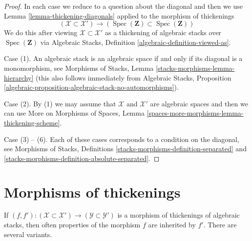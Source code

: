\documentclass{stacks-project}
\theoremstyle{plain}
\theoremstyle{definition}
\theoremstyle{remark}
\numberwithin{equation}{subsection}
\def\Spec{\mathop{\mathrm{Spec}}}
\begin{document}
\begin{proof}
In each case we reduce to a question about the diagonal and then
we use Lemma \ref{lemma-thickening-diagonals} applied to the
morphism of thickenings
$$
(\mathcal{X} \subset \mathcal{X}') \to
\left(\Spec(\mathbf{Z}) \subset \Spec(\mathbf{Z})\right)
$$
We do this after viewing
$\mathcal{X} \subset \mathcal{X}'$ as a thickening of algebraic stacks
over $\Spec(\mathbf{Z})$ via
Algebraic Stacks, Definition \ref{algebraic-definition-viewed-as}.

\medskip\noindent
Case (1). An algebraic stack is an algebraic space if and only if its
diagonal is a monomorphism, see
Morphisms of Stacks, Lemma \ref{stacks-morphisms-lemma-hierarchy}
(this also follows immediately from Algebraic Stacks,
Proposition \ref{algebraic-proposition-algebraic-stack-no-automorphisms}).

\medskip\noindent
Case (2). By (1) we may assume that $\mathcal{X}$ and $\mathcal{X}'$
are algebraic spaces and then we can use
More on Morphisms of Spaces, Lemma
\ref{spaces-more-morphisms-lemma-thickening-scheme}.

\medskip\noindent
Case (3) -- (6). Each of these cases corresponds to a condition
on the diagonal, see Morphisms of Stacks, Definitions
\ref{stacks-morphisms-definition-separated} and
\ref{stacks-morphisms-definition-absolute-separated}.
\end{proof}









\section{Morphisms of thickenings}
\label{section-morphisms-thickenings}

\noindent
If $(f, f') : (\mathcal{X} \subset \mathcal{X}') \to
(\mathcal{Y} \subset \mathcal{Y}')$ is a morphism
of thickenings of algebraic stacks, then often properties of the morphism
$f$ are inherited by $f'$. There are several variants.
\end{document}
